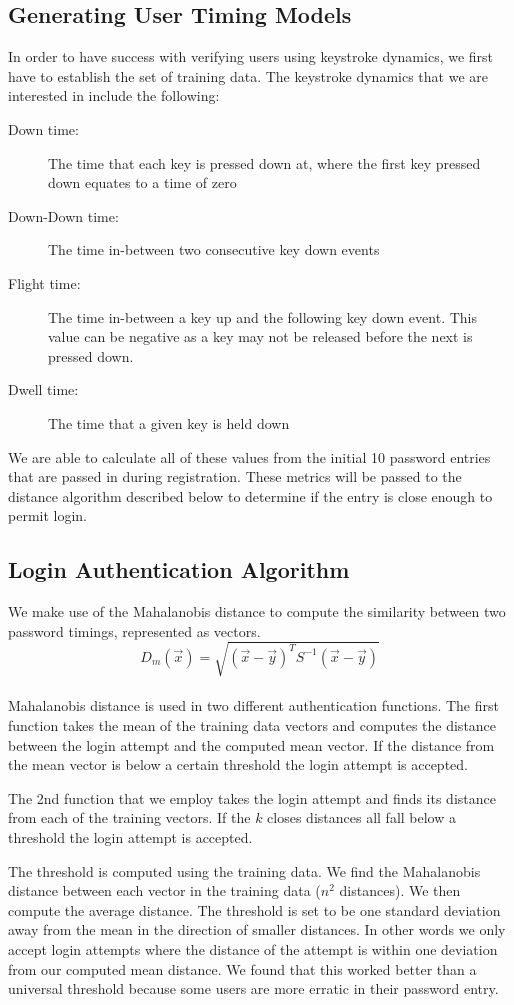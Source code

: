 \documentclass{article}
\begin{document}
\subsection{Generating User Timing Models}
In order to have success with verifying users using keystroke dynamics, we first have to establish the set of training data. The keystroke dynamics that we are interested in include the following:
\begin{description}
	\item[Down time:] The time that each key is pressed down at, where the first key pressed down equates to a time of zero
	\item[Down-Down time:] The time in-between two consecutive key down events
	\item[Flight time:] The time in-between a key up and the following key down event. This value can be negative as a key may not be released before the next is pressed down. 
	\item[Dwell time:] The time that a given key is held down
\end{description}
We are able to calculate all of these values from the initial 10 password entries that are passed in during registration. These metrics will be passed to the distance algorithm described below to determine if the entry is close enough to permit login.

\subsection{Login Authentication Algorithm}
We make use of the Mahalanobis distance to compute the similarity between two password timings, represented as vectors.  \\
\begin{displaymath}
D_m(\vec{x}) = \sqrt{(\vec{x}-\vec{y})^T S^{-1} (\vec{x}-\vec{y})}
\end{displaymath} \\
Mahalanobis distance is used in two different authentication functions. The first function takes the mean of the training data vectors and computes the distance between the login attempt and the computed mean vector. If the distance from the mean vector is below a certain threshold the login attempt is accepted. 

The 2nd function that we employ takes the login attempt and finds its distance from each of the training vectors. If the $k$ closes distances all fall below a threshold the login attempt is accepted.
 
The threshold is computed using the training data. We find the Mahalanobis distance between each vector in the training data ($n^2$ distances). We then compute the average distance. The threshold is set to be one standard deviation away from the mean in the direction of smaller distances. In other words we only accept login attempts where the distance of the attempt is within one deviation from our computed mean distance. We found that this worked better than a universal threshold because some users are more erratic in their password entry.
\end{document}
